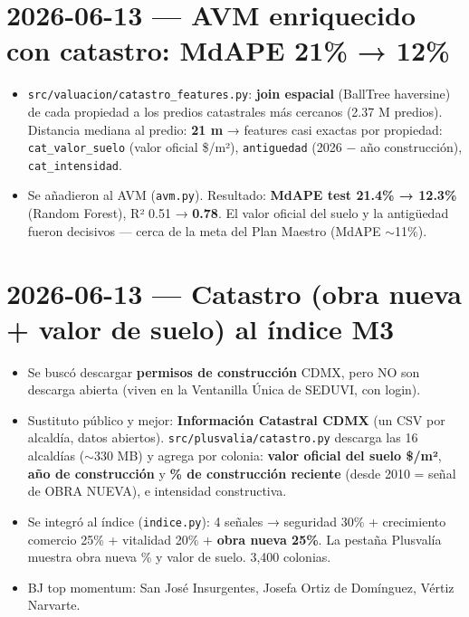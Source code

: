 \documentclass[11pt]{article}
\newcommand{\codigo}[1]{\texttt{#1}}
\begin{document}
\section*{2026-06-13 — AVM enriquecido con catastro: MdAPE 21\% → 12\%}

\begin{itemize}
  \item \codigo{src/valuacion/catastro\_features.py}: \textbf{join espacial}
        (BallTree haversine) de cada propiedad a los predios catastrales más
        cercanos (2.37 M predios). Distancia mediana al predio: \textbf{21 m} →
        features casi exactas por propiedad: \codigo{cat\_valor\_suelo} (valor
        oficial \$/m²), \codigo{antiguedad} (2026 − año construcción),
        \codigo{cat\_intensidad}.
  \item Se añadieron al AVM (\codigo{avm.py}). Resultado:
        \textbf{MdAPE test 21.4\% → 12.3\%} (Random Forest), R² 0.51 → \textbf{0.78}.
        El valor oficial del suelo y la antigüedad fueron decisivos — cerca de la
        meta del Plan Maestro (MdAPE $\sim$11\%).
\end{itemize}

\section*{2026-06-13 — Catastro (obra nueva + valor de suelo) al índice M3}

\begin{itemize}
  \item Se buscó descargar \textbf{permisos de construcción} CDMX, pero NO son
        descarga abierta (viven en la Ventanilla Única de SEDUVI, con login).
  \item Sustituto público y mejor: \textbf{Información Catastral CDMX} (un CSV por
        alcaldía, datos abiertos). \codigo{src/plusvalia/catastro.py} descarga las
        16 alcaldías ($\sim$330 MB) y agrega por colonia: \textbf{valor oficial del
        suelo \$/m²}, \textbf{año de construcción} y \textbf{\% de construcción
        reciente} (desde 2010 = señal de OBRA NUEVA), e intensidad constructiva.
  \item Se integró al índice (\codigo{indice.py}): 4 señales →
        seguridad 30\% + crecimiento comercio 25\% + vitalidad 20\% +
        \textbf{obra nueva 25\%}. La pestaña Plusvalía muestra obra nueva \% y
        valor de suelo. 3{,}400 colonias.
  \item BJ top momentum: San José Insurgentes, Josefa Ortiz de Domínguez, Vértiz
        Narvarte.
\end{itemize}
\end{document}
